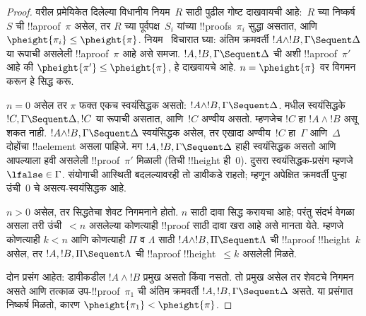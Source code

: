\documentclass[../../../include/open-logic-section]{subfiles}
\begin{document}
\begin{proof}
वरील प्रमेयिकेत दिलेल्या विधानीय नियम~$R$ साठी पुढील
गोष्ट दाखवायची आहे:~$R$ च्या निष्कर्ष~$S$ ची
!!a{proof}~$\pi$ असेल, तर $R$ च्या पूर्वपक्ष~$S_i$
यांच्या !!{proof}s~$\pi_i$ सुद्धा असतात, आणि
$\pheight{\pi_i}
\le \pheight{\pi}$. नियम~\LeftR{\land} विचारात घ्या:
अंतिम क्रमवर्ती $!A \land !B, \Gamma
\Sequent \Delta$ या रूपाची असलेली !!a{proof}~$\pi$
आहे असे समजा. $!A, !B, \Gamma \Sequent \Delta$
ची अशी !!a{proof}~$\pi'$ आहे की $\pheight{\pi'} \le
\pheight{\pi}$, हे दाखवायचे आहे. $n = \pheight{\pi}$
वर विगमन करून हे सिद्ध करू.

$n = 0$ असेल तर $\pi$ फक्त एकच स्वयंसिद्धक
असतो: $!A \land !B, \Gamma
\Sequent \Delta$.  मधील स्वयंसिद्धके
$!C, \Gamma
\Sequent \Delta, !C$ या रूपाची असतात, आणि~$!C$
अण्वीय असतो. म्हणजेच $!C$ हा $!A \land !B$
असू शकत नाही. $!A \land !B, \Gamma \Sequent \Delta$
स्वयंसिद्धक असेल, तर एखादा अण्वीय~$!C$ हा~$\Gamma$
आणि~$\Delta$ दोहोंचा !!a{element} असला पाहिजे.
मग $!A, !B, \Gamma \Sequent \Delta$ हाही
स्वयंसिद्धक असतो आणि आपल्याला हवी असलेली
!!{proof}~$\pi'$ मिळाली (तिची !!{height} ही~$0$).
दुसरा स्वयंसिद्धक-प्रसंग म्हणजे~$\lfalse\in\Gamma$.
संयोगाची आस्थिती बदलल्यावरही तो डावीकडे राहतो;
म्हणून अपेक्षित क्रमवर्ती पुन्हा उंची~$0$ चे
असत्य-स्वयंसिद्धक आहे.

$n>0$ असेल, तर सिद्धतेचा शेवट निगमनाने
होतो. $n$ साठी दावा सिद्ध करायचा आहे; परंतु संदर्भ
वेगळा असला तरी उंची~$<n$ असलेल्या कोणत्याही
!!{proof} साठी दावा खरा आहे असे मानता येते. म्हणजे
कोणत्याही $k<n$ आणि कोणत्याही $\Pi$ व $\Lambda$
साठी $!A \land !B, \Pi \Sequent \Lambda$ ची
!!a{proof} !!{height}~$k$ असेल, तर $!A, !B, \Pi
\Sequent \Lambda$ ची !!a{proof} !!{height}~$\le k$
असलेली मिळते.

दोन प्रसंग आहेत: डावीकडील $!A \land
!B$ प्रमुख असतो किंवा नसतो. तो प्रमुख असेल तर
शेवटचे निगमन~\LeftR{\land} असते आणि तत्काळ
उप-!!{proof}~$\pi_1$ ची अंतिम क्रमवर्ती
$!A, !B, \Gamma \Sequent \Delta$ असते. या
प्रसंगात निष्कर्ष मिळतो, कारण $\pheight{\pi_1} <
\pheight{\pi}$.


\end{proof}
\end{document}
